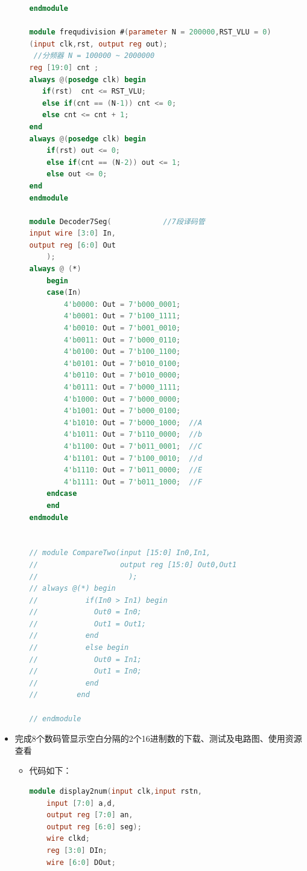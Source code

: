 \documentclass[UTF8,fontset=fandol]{ctexart}
\begin{document}
\begin{itemize}
\begin{itemize}
\begin{lstlisting}[language=Verilog,keywordstyle=\color{red!70}]
endmodule

module frequdivision #(parameter N = 200000,RST_VLU = 0)
(input clk,rst, output reg out); 
 //分频器 N = 100000 ~ 2000000
reg [19:0] cnt ;
always @(posedge clk) begin
   if(rst)  cnt <= RST_VLU;
   else if(cnt == (N-1)) cnt <= 0;
   else cnt <= cnt + 1;
end
always @(posedge clk) begin
    if(rst) out <= 0;
    else if(cnt == (N-2)) out <= 1;
    else out <= 0;
end
endmodule

module Decoder7Seg(            //7段译码管
input wire [3:0] In,
output reg [6:0] Out
    );
always @ (*)
    begin
    case(In)
        4'b0000: Out = 7'b000_0001;
        4'b0001: Out = 7'b100_1111;
        4'b0010: Out = 7'b001_0010;
        4'b0011: Out = 7'b000_0110;
        4'b0100: Out = 7'b100_1100;
        4'b0101: Out = 7'b010_0100;
        4'b0110: Out = 7'b010_0000;
        4'b0111: Out = 7'b000_1111;
        4'b1000: Out = 7'b000_0000;
        4'b1001: Out = 7'b000_0100;
        4'b1010: Out = 7'b000_1000;  //A
        4'b1011: Out = 7'b110_0000;  //b
        4'b1100: Out = 7'b011_0001;  //C
        4'b1101: Out = 7'b100_0010;  //d
        4'b1110: Out = 7'b011_0000;  //E
        4'b1111: Out = 7'b011_1000;  //F
    endcase
    end       
endmodule


// module CompareTwo(input [15:0] In0,In1,
//                   output reg [15:0] Out0,Out1  
//                     );
// always @(*) begin
//           if(In0 > In1) begin
//             Out0 = In0;
//             Out1 = Out1;
//           end
//           else begin
//             Out0 = In1;
//             Out1 = In0;
//           end
//         end

// endmodule

    \end{lstlisting}
\end{itemize}



\item 完成8个数码管显示空白分隔的2个16进制数的下载、测试及电路图、使用资源查看
\begin{itemize}
  \item 代码如下：
  \begin{lstlisting}[language=Verilog,keywordstyle=\color{red!70}]
    module display2num(input clk,input rstn,
    input [7:0] a,d,
    output reg [7:0] an,
    output reg [6:0] seg);
    wire clkd;
    reg [3:0] DIn;
    wire [6:0] DOut;


\end{lstlisting}
\end{itemize}
\end{itemize}
\end{document}
